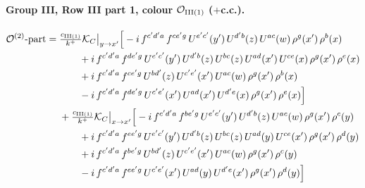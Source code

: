 \documentclass[10pt]{article}
\numberwithin{equation}{section}
\newcommand{\OO}{\mathcal O}
\newcommand{\KK}{\mathcal K}
\begin{document}
\paragraph{Group III, Row III part 1, colour $\OO_{\rm III(1)}$ ($+$c.c.).}
\begin{align}
\OO^{(2)}\text{-part}={}&\tfrac{c_{\rm III(1)}}{k^+}\KK_C\big|_{y\to x'}\Big[-i\,f^{c'd'a}\,f^{ce'g}\,U^{e'c'}(y')\,U^{d'b}(z)\,U^{ac}(w)\,\rho^{g}(x')\,\rho^{b}(x)\notag\\
&\qquad+i\,f^{c'd'a}\,f^{de'g}\,U^{e'c'}(y')\,U^{d'b}(z)\,U^{bc}(z)\,U^{ad}(x')\,U^{ce}(x)\,\rho^{g}(x')\,\rho^{e}(x)\notag\\
&\qquad+i\,f^{c'd'a}\,f^{ce'g}\,U^{bd'}(z)\,U^{c'e'}(x')\,U^{ac}(w)\,\rho^{g}(x')\,\rho^{b}(x)\notag\\
&\qquad-i\,f^{c'd'a}\,f^{de'g}\,U^{c'e'}(x')\,U^{ad}(x')\,U^{d'e}(x)\,\rho^{g}(x')\,\rho^{e}(x)\Big]\notag\\
&+\tfrac{c_{\rm III(1)}}{k^+}\KK_C\big|_{x\to x'}\Big[-i\,f^{c'd'a}\,f^{be'g}\,U^{e'c'}(y')\,U^{d'b}(z)\,U^{ac}(w)\,\rho^{g}(x')\,\rho^{c}(y)\notag\\
&\qquad+i\,f^{c'd'a}\,f^{ee'g}\,U^{e'c'}(y')\,U^{d'b}(z)\,U^{bc}(z)\,U^{ad}(y)\,U^{ce}(x')\,\rho^{g}(x')\,\rho^{d}(y)\notag\\
&\qquad+i\,f^{c'd'a}\,f^{be'g}\,U^{bd'}(z)\,U^{c'e'}(x')\,U^{ac}(w)\,\rho^{g}(x')\,\rho^{c}(y)\notag\\
&\qquad-i\,f^{c'd'a}\,f^{ee'g}\,U^{c'e'}(x')\,U^{ad}(y)\,U^{d'e}(x')\,\rho^{g}(x')\,\rho^{d}(y)\Big]
\end{align}
\end{document}
